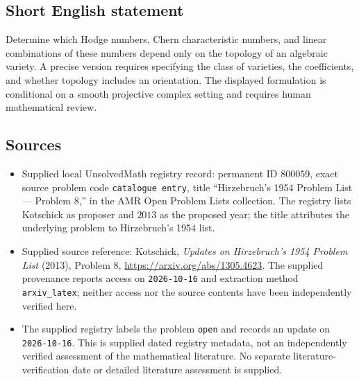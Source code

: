 \documentclass[11pt]{article}
\begin{document}
\subsection{Short English statement}
Determine which Hodge numbers, Chern characteristic numbers, and linear combinations of these numbers depend only on the topology of an algebraic variety. A precise version requires specifying the class of varieties, the coefficients, and whether topology includes an orientation. The displayed formulation is conditional on a smooth projective complex setting and requires human mathematical review.
\subsection{Sources}
\begin{itemize}
\item Supplied local UnsolvedMath registry record: permanent ID \(800059\), exact source problem code \texttt{catalogue entry}, title ``Hirzebruch's 1954 Problem List --- Problem 8,'' in the AMR Open Problem Lists collection. The registry lists Kotschick as proposer and \(2013\) as the proposed year; the title attributes the underlying problem to Hirzebruch's 1954 list.
\item Supplied source reference: Kotschick, \emph{Updates on Hirzebruch's 1954 Problem List} (2013), Problem 8, \url{https://arxiv.org/abs/1305.4623}. The supplied provenance reports access on \texttt{2026-10-16} and extraction method \texttt{arxiv\_latex}; neither access nor the source contents have been independently verified here.
\item The supplied registry labels the problem \texttt{open} and records an update on \texttt{2026-10-16}. This is supplied dated registry metadata, not an independently verified assessment of the mathematical literature. No separate literature-verification date or detailed literature assessment is supplied.
\end{itemize}
\end{document}
